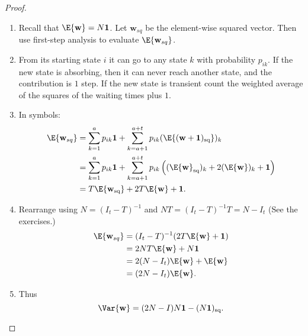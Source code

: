 \documentclass[12pt]{article}
\begin{document}
\begin{proof}
    \begin{enumerate}
        \item
            Recall that \( \E{\mathbf{w}} = N \mathbf{1} \). Let
      \( \mathbf{w}_{sq} \) be the element-wise squared vector. Then
      use first-step analysis to evaluate \( \E{\mathbf{w}_{sq}} \).
        \item
            From its starting state \( i \) it can go to any state \( k \)
            with probability \( p_{ik} \).  If the new state is
            absorbing, then it can never reach another state, and the
            contribution is \( 1 \) step.  If the new state is transient
            count the weighted average of the squares of the waiting
            times plus \( 1 \).
          \item
            In symbols:
            \begin{align*}
                \E{\mathbf{w}_{sq}} &= \sum\limits_{k=1}^{a} p_{ik}
                \mathbf{1} + \sum\limits_{k=a+1}^{a+t} p_{ik} (\E{(\mathbf
                {w}+\mathbf{1})_{\text{sq}} })_k \\
                &= \sum\limits_{k=1}^{a} p_{ik} \mathbf{1} + \sum\limits_
                {k=a+1}^{a+t} p_{ik} \left( (\E{\mathbf{w}}_{\text{sq}})_k
                + 2 (\E{\mathbf{w}})_k + \mathbf{1} \right) \\
                &= T \E{\mathbf{w}_{\text{sq}}} + 2 T\E{\mathbf{w}} +
                \mathbf{1}.
            \end{align*}
        \item
            Rearrange using \( N = (I_t - T)^{-1} \) and \( NT = (I_t -
            T)^{-1} T = N - I_t \) (See the exercises.)
            \begin{align*}
                \E{\mathbf{w}_{sq}} &= (I_t - T)^{-1} (2 T\E{\mathbf{w}}
                + \mathbf{1}) \\
                &= 2NT \E{\mathbf{w}} + N \mathbf{1} \\
                &= 2(N-I_t) \E{\mathbf{w}} + \E{\mathbf{w}} \\
                &= (2N-I_t) \E{\mathbf{w}}.
            \end{align*}
        \item
            Thus
            \[
                \Var{\mathbf{w}} = (2N - I)N\mathbf{1} - (N\mathbf{1})_{\text
                {sq}}.
            \]
    \end{enumerate}
\end{proof}
\end{document}

